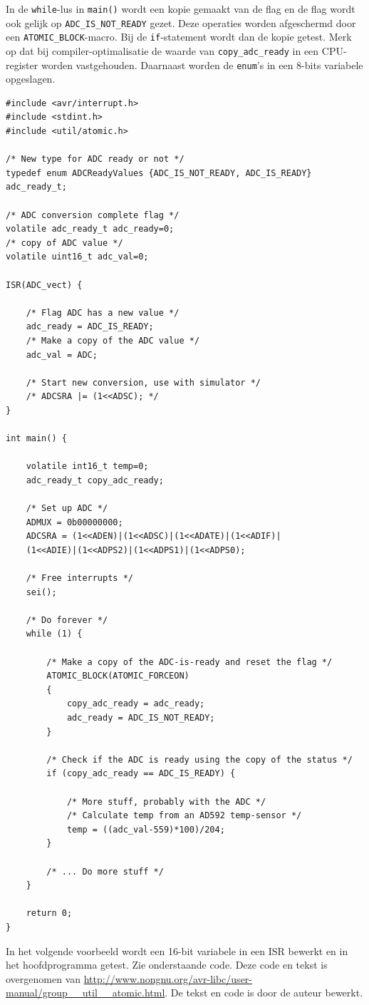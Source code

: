 \documentclass[12pt,a4paper,final,twoside,fleqn]{article}
\def\lstC{\lstinline[style=C]}
\begin{document}
In de \lstC{while}-lus in \lstC{main()} wordt een kopie gemaakt van de flag en de flag
wordt ook gelijk op \lstC{ADC_IS_NOT_READY} gezet. Deze operaties worden afgeschermd door
een \lstC{ATOMIC_BLOCK}-macro. Bij de \lstC{if}-statement wordt dan de kopie getest.
Merk op dat bij compiler-optimalisatie de 
waarde van \lstC{copy_adc_ready} in een CPU-register worden vastgehouden. Daarnaast
worden de \lstC{enum}'s in een 8-bits variabele opgeslagen.


\begin{lstlisting}[style=C,caption=Atomaire acties]
#include <avr/interrupt.h>
#include <stdint.h>
#include <util/atomic.h>

/* New type for ADC ready or not */
typedef enum ADCReadyValues {ADC_IS_NOT_READY, ADC_IS_READY} adc_ready_t;

/* ADC conversion complete flag */
volatile adc_ready_t adc_ready=0;
/* copy of ADC value */
volatile uint16_t adc_val=0;

ISR(ADC_vect) {

	/* Flag ADC has a new value */
	adc_ready = ADC_IS_READY;
	/* Make a copy of the ADC value */
	adc_val = ADC;

	/* Start new conversion, use with simulator */
	/* ADCSRA |= (1<<ADSC); */
}

int main() {

	volatile int16_t temp=0;
	adc_ready_t copy_adc_ready;
	
	/* Set up ADC */
	ADMUX = 0b00000000;
	ADCSRA = (1<<ADEN)|(1<<ADSC)|(1<<ADATE)|(1<<ADIF)|
	(1<<ADIE)|(1<<ADPS2)|(1<<ADPS1)|(1<<ADPS0);
	
	/* Free interrupts */
	sei();

	/* Do forever */
	while (1) {

		/* Make a copy of the ADC-is-ready and reset the flag */
		ATOMIC_BLOCK(ATOMIC_FORCEON)
		{
			copy_adc_ready = adc_ready;
			adc_ready = ADC_IS_NOT_READY;
		}

		/* Check if the ADC is ready using the copy of the status */
		if (copy_adc_ready == ADC_IS_READY) {

			/* More stuff, probably with the ADC */
			/* Calculate temp from an AD592 temp-sensor */
			temp = ((adc_val-559)*100)/204;
		}
		
		/* ... Do more stuff */
	}
	
	return 0;
}
\end{lstlisting}

In het volgende voorbeeld wordt een 16-bit variabele in een ISR bewerkt en in het
hoofdprogramma getest. Zie onderstaande code. Deze code en tekst is overgenomen
van \url{http://www.nongnu.org/avr-libc/user-manual/group__util__atomic.html}.
De tekst en code is door de auteur bewerkt.
\end{document}
